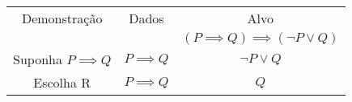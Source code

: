 \documentclass[a4paper, 12pt]{article}
\begin{document}
\begin{enumerate}
\begin{enumerate}
\begin{table}[h!]
            \begin{tabular}{|c | c | c |} 
            Demonstração & Dados & Alvo \\
            & & $(P \implies Q) \implies (\neg P \lor Q)$ \\
            Suponha $P \implies Q$ & $P \implies Q$ & $\neg P \lor Q$ \\
            Escolha R & $P \implies Q$ & $Q$ \\
            \end{tabular}
        \end{table}
    \end{enumerate}
\end{enumerate}
\end{document}
